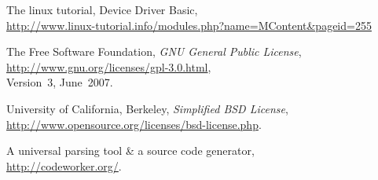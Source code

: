 \begin{thebibliography}{9}

The linux tutorial,
Device Driver Basic,\\
\url{http://www.linux-tutorial.info/modules.php?name=MContent&pageid=255}

The Free Software Foundation,
\emph{GNU General Public License},\\
\url{http://www.gnu.org/licenses/gpl-3.0.html},\\
Version~3,
June~2007.

University of California, Berkeley,
\emph{Simplified BSD License},\\
\url{http://www.opensource.org/licenses/bsd-license.php}.

A universal parsing tool \& a source code generator,\\
\url{http://codeworker.org/}.

\end{thebibliography}
